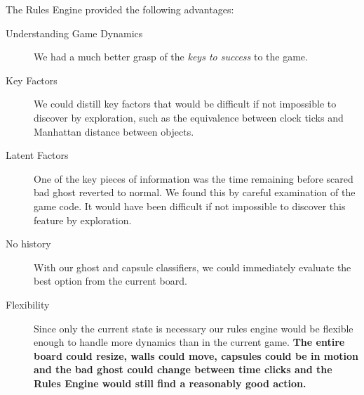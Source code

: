 \documentclass[11pt, oneside]{article}   	%
\begin{document}
The Rules Engine provided the following advantages:
\begin{description}
	\item[Understanding Game Dynamics]We had a much better grasp of the \emph{keys to success} to the game.
	\item[Key Factors]We could distill key factors that would be difficult if not impossible to discover by exploration, such as the equivalence between clock ticks and Manhattan distance between objects.
	\item[Latent Factors]One of the key pieces of information was the time remaining before scared bad ghost reverted to normal. We found this by careful examination of the game code. It would have been difficult if not impossible to discover this feature by exploration.
	\item[No history]With our ghost and capsule classifiers, we could immediately evaluate the best option from the current board.
	\item[Flexibility]Since only the current state is necessary our rules engine would be flexible enough to handle more dynamics than in the current game. \bf{The entire board could resize,  walls could move, capsules could be in motion and the bad ghost could change between time clicks and the Rules Engine would still find  a reasonably good action.}
\end{description}
\end{document}

